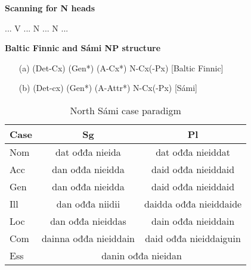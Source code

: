 \documentclass[landscape,english,11pt]{seminar}
\begin{document}
\begin{slide}
\newslide
\textbf{Scanning for N heads}
\begin{example}\label{islands}
... V ... N ... N ...
\end{example}



\newslide
\textbf{Baltic Finnic and Sámi NP structure}
\begin{example}\label{NP}
\begin{itemize}
\item[(a)] (Det-Cx) (Gen*) (A-Cx*) N-Cx(-Px) [Baltic Finnic]
\item[(b)] (Det-cx) (Gen*) (A-Attr*) N-Cx(-Px) [Sámi]
\end{itemize}
\end{example}


\newslide
\begin{table}[htdp]
\caption{North Sámi case paradigm}
\begin{center}
\begin{tabular}{|l|c|c|}
\hline
Case  & Sg       & Pl                        \\ \hline
Nom    & dat ođđa nieida      & dat ođđa nieiddat           \\ \hline
Acc    & dan ođđa nieidda    & daid ođđa nieiddaid         \\ \hline
Gen    & dan ođđa nieidda    & daid ođđa nieiddaid         \\ \hline
Ill    & dan ođđa niidii   & daidda ođđa nieiddaide      \\ \hline
Loc    & dan ođđa nieiddas   & dain ođđa nieiddain          \\ \hline
Com    & dainna ođđa nieiddain & daid ođđa  nieiddaiguin     \\ \hline
Ess & \multicolumn{2}{c|}{danin ođđa nieidan}      \\ \hline
\end{tabular}
\end{center}
\label{smecas}
\end{table}%



\end{slide}
\end{document}
